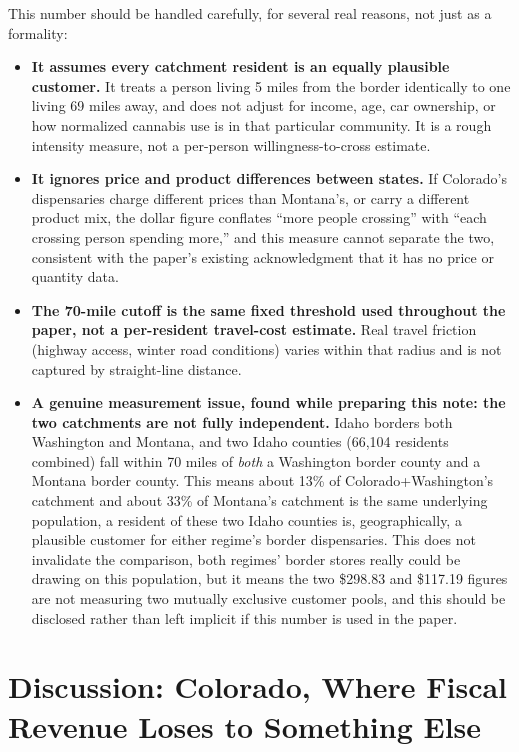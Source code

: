 \documentclass[11pt]{article}
\begin{document}
This number should be handled carefully, for several real reasons, not just as a formality:

\begin{itemize}
\item \textbf{It assumes every catchment resident is an equally plausible customer.} It treats a person
living 5 miles from the border identically to one living 69 miles away, and does not adjust for income,
age, car ownership, or how normalized cannabis use is in that particular community. It is a rough
intensity measure, not a per-person willingness-to-cross estimate.
\item \textbf{It ignores price and product differences between states.} If Colorado's dispensaries charge
different prices than Montana's, or carry a different product mix, the dollar figure conflates
``more people crossing'' with ``each crossing person spending more,'' and this measure cannot separate the
two, consistent with the paper's existing acknowledgment that it has no price or quantity data.
\item \textbf{The 70-mile cutoff is the same fixed threshold used throughout the paper, not a
per-resident travel-cost estimate.} Real travel friction (highway access, winter road conditions) varies
within that radius and is not captured by straight-line distance.
\item \textbf{A genuine measurement issue, found while preparing this note: the two catchments are not
fully independent.} Idaho borders both Washington and Montana, and two Idaho counties (66{,}104
residents combined) fall within 70 miles of \emph{both} a Washington border county and a Montana border
county. This means about 13\% of Colorado+Washington's catchment and about 33\% of Montana's catchment is
the same underlying population, a resident of these two Idaho counties is, geographically, a plausible
customer for either regime's border dispensaries. This does not invalidate the comparison, both regimes'
border stores really could be drawing on this population, but it means the two \$298.83 and \$117.19
figures are not measuring two mutually exclusive customer pools, and this should be disclosed rather than
left implicit if this number is used in the paper.
\end{itemize}

\section{Discussion: Colorado, Where Fiscal Revenue Loses to Something Else}
\label{sec:colorado-puzzle}
\end{document}
